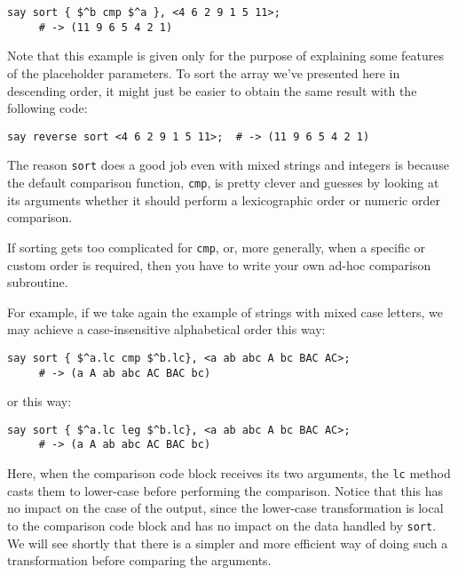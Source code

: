 \begin{verbatim}
say sort { $^b cmp $^a }, <4 6 2 9 1 5 11>;
     # -> (11 9 6 5 4 2 1)
\end{verbatim}

Note that this example is given only for the purpose of 
explaining some features of the placeholder parameters. 
To sort the array we've presented here in descending order, 
it might just be easier to obtain the same result with the 
following code:

\begin{verbatim}
say reverse sort <4 6 2 9 1 5 11>;  # -> (11 9 6 5 4 2 1)
\end{verbatim}

The reason {\tt sort} does a good job even with mixed 
strings and integers is because the default comparison 
function, {\tt cmp}, is pretty clever and guesses by 
looking at its arguments whether it should perform 
a lexicographic order or numeric order comparison.

If sorting gets too complicated for {\tt cmp}, or, more 
generally, when a specific or custom order is required, 
then you have to write your own ad-hoc comparison 
subroutine.

For example, if we take again the example of strings 
with mixed case letters, we may achieve a case-insensitive 
alphabetical order this way:

\begin{verbatim}
say sort { $^a.lc cmp $^b.lc}, <a ab abc A bc BAC AC>;
     # -> (a A ab abc AC BAC bc)
\end{verbatim}

or this way:
\begin{verbatim}
say sort { $^a.lc leg $^b.lc}, <a ab abc A bc BAC AC>;
     # -> (a A ab abc AC BAC bc)
\end{verbatim}

Here, when the comparison code block receives its two 
arguments, the {\tt lc} method casts them to lower-case 
before performing the comparison. Notice that this has 
no impact on the case of the output, since the lower-case 
transformation is local to the comparison code block and 
has no impact on the data handled by {\tt sort}. We will 
see shortly that there is a simpler and more efficient 
way of doing such a transformation before comparing the 
arguments.

